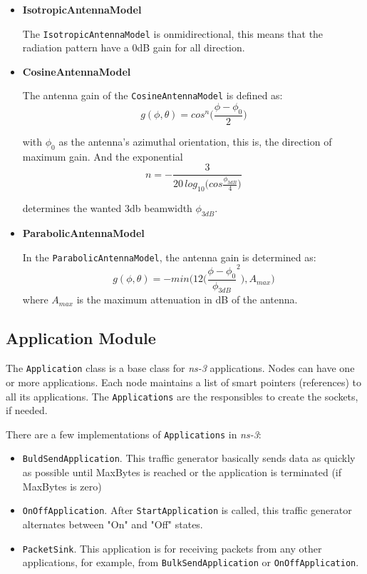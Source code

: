 \begin{itemize}[itemsep=0pt, topsep=0pt]
  \item \textbf{IsotropicAntennaModel} 
  
  The \texttt{IsotropicAntennaModel} is onmidirectional, this means that the radiation pattern have
  a 0dB gain for all direction.
  \item \textbf{CosineAntennaModel}
  
  The antenna gain of the \texttt{CosineAntennaModel} is defined as:
  \begin{equation}
    g(\phi,\theta)=cos^n \bigg( \frac{\phi-\phi_0}{2} \bigg)
  \end{equation}

  with ${\phi_0}$ as the antenna's azimuthal orientation, this is, the direction of maximum gain. And the exponential
  \begin{equation}
    n=-\frac{3}{20\,log_{10} \big( cos\frac{\phi_{3dB}}{4} \big) }
  \end{equation}

  determines the wanted 3db beamwidth ${\phi_{3dB}}$.
  \item \textbf{ParabolicAntennaModel}

  In the \texttt{ParabolicAntennaModel}, the antenna gain is determined as:
  \begin{equation}
    g(\phi,\theta)=-min \bigg( 12 \bigg( \frac{\phi-\phi_0}{\phi_{3dB}}^2 \bigg) ,A_{max} \bigg)
  \end{equation}
  where ${A_{max}}$ is the maximum attenuation in dB of the antenna. 
\end{itemize}

\subsection{Application Module}
The \texttt{Application} class is a base class for \textit{ns-3} applications. Nodes can
have one or more applications. Each node maintains a list of smart pointers (references) 
to all its applications. The \texttt{Applications} are the responsibles to create the sockets,
if needed.

There are a few implementations of \texttt{Applications} in \textit{ns-3}:
\begin{itemize}[topsep=0pt, itemsep=0pt]
  \item \texttt{BuldSendApplication}. This traffic generator basically sends data as quickly as possible
  until MaxBytes is reached or the application is terminated (if MaxBytes is zero)
  \item \texttt{OnOffApplication}. After \texttt{StartApplication} is called, this traffic generator 
  alternates between "On" and "Off" states.
  \item \texttt{PacketSink}. This application is for receiving packets from any other applications, for
  example, from \texttt{BulkSendApplication} or \texttt{OnOffApplication}.
\end{itemize}

